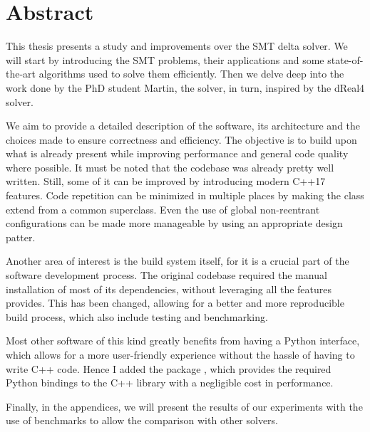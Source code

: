 \chapter*{Abstract}
This thesis presents a study and improvements over the \dlinearfour SMT delta solver.
We will start by introducing the SMT problems, their applications and some state-of-the-art algorithms used to solve them efficiently.
Then we delve deep into the work done by the PhD student Martin, the \dlinearfour solver, in turn, inspired by the dReal4 solver.

We aim to provide a detailed description of the software, its architecture and the choices made to ensure correctness and efficiency.
The objective is to build upon what is already present while improving performance and general code quality where possible.
It must be noted that the codebase was already pretty well written.
Still, some of it can be improved by introducing modern C++17 features.
Code repetition can be minimized in multiple places by making the class extend from a common superclass.
Even the use of global non-reentrant configurations can be made more manageable by using an appropriate design patter.

Another area of interest is the build system itself, for it is a crucial part of the software development process.
The original codebase required the manual installation of most of its dependencies, without leveraging all the features \bazel provides.
This has been changed, allowing for a better and more reproducible build process, which also include testing and benchmarking.

Most other software of this kind greatly benefits from having a Python interface, which allows for a more user-friendly experience without the hassle of having to write C++ code.
Hence I added the package \pydlinear, which provides the required Python bindings to the \dlinear C++ library with a negligible cost in performance.

Finally, in the appendices, we will present the results of our experiments with the use of benchmarks to allow the comparison with other solvers.

